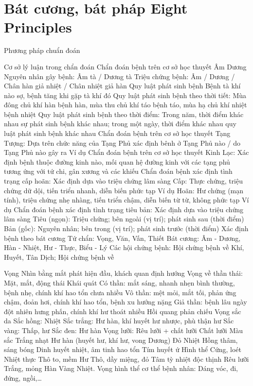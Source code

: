 \documentclass[
	11pt, %
]{beamer}
\theoremstyle{newblock}
\begin{document}
\section{ Bát cương, bát pháp \newline Eight Principles}
\begin{frame}
	\Huge{Phương pháp chuẩn đoán}
\end{frame}
\begin{frame}
	Cơ sở lý luận trong chẩn đoán
Chẩn đoán bệnh trên cơ sở học thuyết Âm Dương
Nguyên nhân gây bệnh: Âm tà / Dương tà
Triệu chứng bệnh: Âm / Dương / Chân hàn giả nhiệt / Chân nhiệt giả hàn
Quy luật phát sinh bệnh
Bệnh tà khí nào  sợ, bệnh tăng khi gặp tà khí đó
Quy luật phát sinh bệnh theo thời tiết: Mùa đông chủ khí hàn  bệnh hàn, mùa thu chủ khí táo 
bệnh táo, mùa hạ chủ khí nhiệt  bệnh nhiệt
Quy luật phát sinh bệnh theo thời điểm: Trong năm, thời điểm khác nhau  sự phát sinh bệnh khác nhau; trong một ngày, thời điểm khác nhau  quy luật phát sinh bệnh khác nhau
Chẩn đoán bệnh trên cơ sở học thuyết Tạng Tượng: Dựa trên chức năng của Tạng Phủ
 xác định bênh ở Tạng Phủ nào / do Tạng Phủ nào gây ra Ví dụ
 Chẩn đoán bệnh trên cơ sở học thuyết Kinh Lạc: Xác định bệnh thuộc đường kinh nào, mối quan hệ đường kinh với các tạng phủ tương ứng với tứ chi, gân xương và các khiếu
Chẩn đoán bệnh xác định tình trạng cấp  hoãn: Xác định dựa vào triệu chứng lâm sàng
Cấp: Thực chứng, triệu chứng dữ dội, tiến triển nhanh, diễn biến phức tạp  Ví dụ
Hoãn: Hư chứng (mạn tính), triệu chứng nhẹ nhàng, tiến triển chậm, diễn biến từ từ, không phức tạp Ví dụ
Chẩn đoán bệnh xác định tình trạng tiêu  bản: Xác định dựa vào triệu chứng lâm sàng
Tiêu (ngọn):  Triệu chứng;  bên ngoài (vị trí);  phát sinh sau (thời điểm)
Bản (gốc):  Nguyên nhân;  bên trong (vị trí);  phát sinh trước (thời điểm)
 Xác định bệnh theo bát cương
Tứ chẩn: Vọng, Văn, Vấn, Thiết
Bát cương: Âm - Dương, Hàn - Nhiệt, Hư - Thực, Biểu - Lý
Các hội chứng bệnh: Hội chứng bệnh về Khí, Huyết, Tân Dịch; Hội chứng bệnh về
\end{frame}
\begin{frame}{Vọng}
	Nhìn bằng mắt  phát hiện đầu, khách quan  định hướng
Vọng về thần thái: Mặt, mắt, động thái  Khái quát
Có thần: mắt sáng, nhanh nhẹn bình thường, bệnh nhẹ, chính khí hao tổn chưa nhiều
Vô thần: mệt mỏi, mắt tối, phản ứng chậm, đoản hơi, chính khí hao tổn, bệnh xu hướng nặng
Giả thần: bệnh lâu ngày đột nhiên hưng phấn, chính khí hư thoát nhiều  Hồi quang phản chiếu
Vọng sắc da
Sắc hồng: Nhiệt
Sắc trắng: Hư hàn, khí huyết hư nhược, phù  thận hư
Sắc vàng: Thấp, hư
Sắc đen: Hư hàn
Vọng lưỡi: Rêu lưỡi + chất lưỡi
Chất lưỡi
Màu sắc
Trắng nhạt  Hư hàn (huyết hư, khí hư, vong Dương)
Đỏ  Nhiệt
Hồng thâm, sáng bóng  Dinh huyết nhiệt, âm tinh hao tổn
Tím  huyết ứ
Hình thể
Cứng, loét  Nhiệt thực
Thô to, mềm  Hư
Thô, dầy miệng, đỏ  Tâm tỳ nhiệt độc thịnh
Rêu lưỡi
Trắng, mỏng  Hàn
Vàng  Nhiệt.
Vọng hình thể cơ thể bệnh nhân: Dáng vóc, đi, đứng, ngồi,…

\end{frame}
\end{document}
